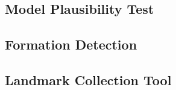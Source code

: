 \documentclass[a4paper, 12pt]{article}
\begin{document}
	\subsection{Model Plausibility Test}
	\subsection{Formation Detection}
	
	\subsection{Landmark Collection Tool}
	
\end{document}

